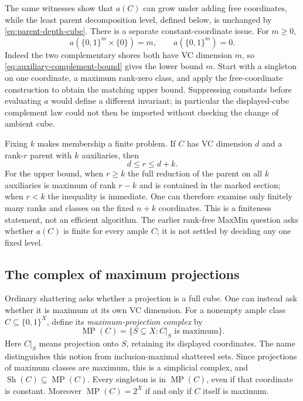 \documentclass[11pt]{article}
\theoremstyle{definition}
\newcommand{\bits}{\{0,1\}}
\newcommand{\Sh}{\operatorname{Sh}}
\begin{document}
The same witnesses show that $a(C)$ can grow under adding free coordinates,
while the least parent decomposition level, defined below, is unchanged
by \eqref{eq:parent-depth-cube}.
There is a separate constant-coordinate issue. For $m\ge0$,
\begin{equation}\label{eq:auxiliary-constant-example}
 a(\bits^m\times\{0\})=m,
 \qquad a(\bits^m)=0.
\end{equation}
Indeed the two complementary shores both have VC dimension $m$, so
\eqref{eq:auxiliary-complement-bound} gives the lower bound $m$.
Start with a singleton on one coordinate, a maximum rank-zero class,
and apply the free-coordinate construction to obtain the matching upper
bound. Suppressing constants before evaluating $a$ would define a different
invariant; in particular the displayed-cube complement law could not then
be imported without checking the change of ambient cube.

Fixing $k$ makes membership a finite problem. If $C$ has VC dimension $d$
and a rank-$r$ parent with $k$ auxiliaries, then
\[
 d\le r\le d+k.
\]
For the upper bound, when $r\ge k$ the full reduction of the parent on
all $k$ auxiliaries is maximum of rank $r-k$ and is contained in the marked
section; when $r<k$ the inequality is immediate. One can therefore examine
only finitely many ranks and classes on the fixed $n+k$ coordinates. This
is a finiteness statement, not an efficient algorithm. The earlier rank-free
MaxMin question asks whether $a(C)$ is finite for every ample $C$; it is not
settled by deciding any one fixed level.

\subsection{The complex of maximum projections}
\label{sec:maximum-projection-complex}

Ordinary shattering asks whether a projection is a full cube. One can instead
ask whether it is maximum at its own VC dimension. For a nonempty ample
class $C\subseteq\bits^X$, define its \emph{maximum-projection complex} by
\[
 \operatorname{MP}(C)=\{S\subseteq X:C|_S\text{ is maximum}\}.
\]
Here $C|_S$ means projection onto $S$, retaining its displayed coordinates.
The name distinguishes this notion from inclusion-maximal shattered sets.
Since projections of maximum classes are maximum, this is a simplicial
complex, and $\Sh(C)\subseteq\operatorname{MP}(C)$. Every singleton is
in $\operatorname{MP}(C)$, even if that coordinate is constant. Moreover
$\operatorname{MP}(C)=2^X$ if and only if $C$ itself is maximum.
\end{document}
